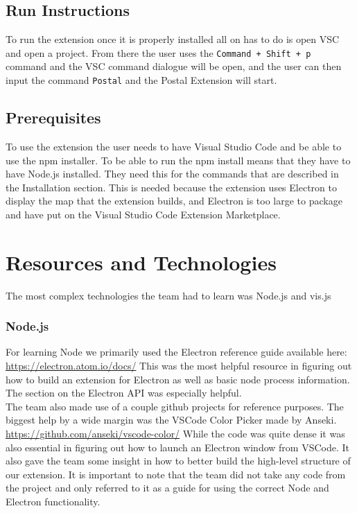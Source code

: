 \documentclass[letterpaper,10pt,titlepage,draftclsnofoot,onecolumn,onesided] {IEEEtran}
\begin{document}
\subsection{Run Instructions}

To run the extension once it is properly installed all on has to do is open VSC and open a project. 
From there the user uses the \texttt{Command + Shift + p} command and the VSC command dialogue will be open, and the user can then input the command \texttt{Postal} and the Postal Extension will start.

\subsection{Prerequisites}

To use the extension the user needs to have Visual Studio Code and be able to use the npm installer.
To be able to run the npm install means that they have to have Node.js installed. 
They need this for the commands that are described in the Installation section.
This is needed because the extension uses Electron to display the map that the extension builds, and Electron is too large to package and have put on the Visual Studio Code Extension Marketplace.


\section{Resources and Technologies}

The most complex technologies the team had to learn was Node.js and vis.js

\subsubsection{Node.js}
For learning Node we primarily used the Electron reference guide available here: 
\url{https://electron.atom.io/docs/}
This was the most helpful resource in figuring out how to build an extension for Electron as well as basic node process information. 
The section on the Electron API was especially helpful. \\

The team also made use of a couple github projects for reference purposes. 
The biggest help by a wide margin was the VSCode Color Picker made by Anseki.
\url{https://github.com/anseki/vscode-color/}
While the code was quite dense it was also essential in figuring out how to launch an Electron window from VSCode. 
It also gave the team some insight in how to better build the high-level structure of our extension. 
It is important to note that the team did not take any code from the project and only referred to it as a guide for using the correct Node and Electron functionality. \\
\end{document}
